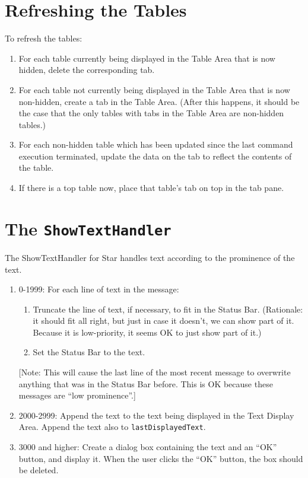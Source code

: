 \documentclass[11pt]{article}
\begin{document}
\section{Refreshing the Tables}

To refresh the tables:
\begin{enumerate}
\item For each table currently being displayed in the Table Area
  that is now hidden, delete the corresponding tab.
\item For each table not currently being displayed in the Table
  Area that is now non-hidden, create a tab in the Table Area.
  (After this happens, it should be the case that the only tables
  with tabs in the Table Area are non-hidden tables.)
\item For each non-hidden table which has been updated since the
  last command execution terminated, update the data on the tab
  to reflect the contents of the table.
\item If there is a top table now, place that table's tab on top
  in the tab pane.
\end{enumerate}

\section{The {\tt ShowTextHandler}}

The ShowTextHandler for Star handles text according to the prominence of
the text.
\begin{enumerate}
\item 0-1999:  For each line of text in the message:
  \begin{enumerate}
  \item Truncate the line of text, if necessary, to fit in the Status Bar.
    (Rationale:  it should fit all right, but just in case it doesn't, we
    can show part of it.  Because it is low-priority, it seems OK to
    just show part of it.)
  \item Set the Status Bar to the text.
  \end{enumerate}
  [Note: This will cause the last line of the most recent message to
  overwrite anything that was in the Status Bar before.  This is OK
  because these messages are ``low prominence''.]
\item 2000-2999:  Append the text to the text being displayed in the
  Text Display Area.  Append the text also to {\tt lastDisplayedText}.
\item 3000 and higher:  Create a dialog box containing the text and an
  ``OK'' button, and display it.  When the user clicks the ``OK'' button,
  the box should be deleted.
\end{enumerate}
\end{document}

